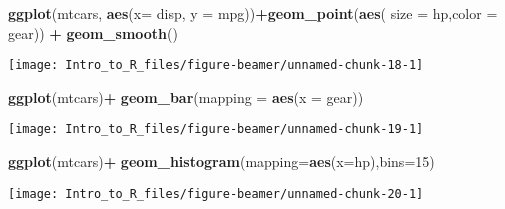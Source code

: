 \documentclass[ignorenonframetext,]{beamer}
\newenvironment{Shaded}{\begin{snugshade}}{\end{snugshade}}
\newcommand{\DataTypeTok}[1]{\textcolor[rgb]{0.13,0.29,0.53}{#1}}
\newcommand{\DecValTok}[1]{\textcolor[rgb]{0.00,0.00,0.81}{#1}}
\newcommand{\KeywordTok}[1]{\textcolor[rgb]{0.13,0.29,0.53}{\textbf{#1}}}
\newcommand{\NormalTok}[1]{#1}
\newcommand{\OperatorTok}[1]{\textcolor[rgb]{0.81,0.36,0.00}{\textbf{#1}}}
\newcommand{\StringTok}[1]{\textcolor[rgb]{0.31,0.60,0.02}{#1}}
\begin{document}
\begin{frame}[fragile]

\begin{Shaded}
\begin{Highlighting}[]
\KeywordTok{ggplot}\NormalTok{(mtcars, }\KeywordTok{aes}\NormalTok{(}\DataTypeTok{x=}\NormalTok{ disp, }\DataTypeTok{y =}\NormalTok{ mpg))}\OperatorTok{+}\KeywordTok{geom_point}\NormalTok{(}\KeywordTok{aes}\NormalTok{(}
  \DataTypeTok{size =}\NormalTok{ hp,}\DataTypeTok{color =}\NormalTok{ gear)) }\OperatorTok{+}\StringTok{ }\KeywordTok{geom_smooth}\NormalTok{()}
\end{Highlighting}
\end{Shaded}

\begin{center}\texttt{[image: Intro\_to\_R\_files/figure-beamer/unnamed-chunk-18-1]} \end{center}

\end{frame}

\begin{frame}[fragile]

\begin{Shaded}
\begin{Highlighting}[]
\KeywordTok{ggplot}\NormalTok{(mtcars)}\OperatorTok{+}\StringTok{ }\KeywordTok{geom_bar}\NormalTok{(}\DataTypeTok{mapping =} \KeywordTok{aes}\NormalTok{(}\DataTypeTok{x =}\NormalTok{ gear))}
\end{Highlighting}
\end{Shaded}

\begin{center}\texttt{[image: Intro\_to\_R\_files/figure-beamer/unnamed-chunk-19-1]} \end{center}

\end{frame}

\begin{frame}[fragile]

\begin{Shaded}
\begin{Highlighting}[]
\KeywordTok{ggplot}\NormalTok{(mtcars)}\OperatorTok{+}\StringTok{ }\KeywordTok{geom_histogram}\NormalTok{(}\DataTypeTok{mapping=}\KeywordTok{aes}\NormalTok{(}\DataTypeTok{x=}\NormalTok{hp),}\DataTypeTok{bins=}\DecValTok{15}\NormalTok{)}
\end{Highlighting}
\end{Shaded}

\begin{center}\texttt{[image: Intro\_to\_R\_files/figure-beamer/unnamed-chunk-20-1]} \end{center}

\end{frame}
\end{document}
